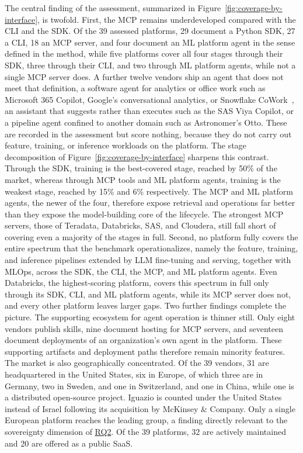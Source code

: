 \documentclass[
english,                 %
bibtex,                  %
]{kththesis}
\numberwithin{listing}{chapter}
\begin{document}
The central finding of the assessment, summarized in Figure~\ref{fig:coverage-by-interface}, is twofold. First, the \gls{MCP} remains underdeveloped compared with the \gls{CLI} and the \gls{SDK}. Of the 39 assessed platforms, 29 document a Python \gls{SDK}, 27 a \gls{CLI}, 18 an \gls{MCP} server, and four document an \gls{ML} platform agent in the sense defined in the method, while five platforms cover all four stages through their \gls{SDK}, three through their \gls{CLI}, and two through \gls{ML} platform agents, while not a single \gls{MCP} server does. A further twelve vendors ship an agent that does not meet that definition, a software agent for analytics or office work such as Microsoft 365 Copilot, Google's conversational analytics, or Snowflake CoWork~\cite{agarwal_snowflake_2026}, an assistant that suggests rather than executes such as the \gls{SAS} Viya Copilot, or a pipeline agent confined to another domain such as Astronomer's Otto. These are recorded in the assessment but score nothing, because they do not carry out feature, training, or inference workloads on the platform. The stage decomposition of Figure~\ref{fig:coverage-by-interface} sharpens this contrast. Through the \gls{SDK}, training is the best-covered stage, reached by 50\% of the market, whereas through \gls{MCP} tools and \gls{ML} platform agents, training is the weakest stage, reached by 15\% and 6\% respectively. The \gls{MCP} and \gls{ML} platform agents, the newer of the four, therefore expose retrieval and operations far better than they expose the model-building core of the lifecycle. The strongest \gls{MCP} servers, those of Teradata, Databricks, \gls{SAS}, and Cloudera, still fall short of covering even a majority of the stages in full. Second, no platform fully covers the entire spectrum that the benchmark operationalizes, namely the feature, training, and inference pipelines extended by \gls{LLM} fine-tuning and serving, together with \gls{MLOps}, across the \gls{SDK}, the \gls{CLI}, the \gls{MCP}, and \gls{ML} platform agents. Even Databricks, the highest-scoring platform, covers this spectrum in full only through its \gls{SDK}, \gls{CLI}, and \gls{ML} platform agents, while its \gls{MCP} server does not, and every other platform leaves larger gaps. Two further findings complete the picture. The supporting ecosystem for agent operation is thinner still. Only eight vendors publish skills, nine document hosting for \gls{MCP} servers, and seventeen document deployments of an organization's own agent in the platform. These supporting artifacts and deployment paths therefore remain minority features. The market is also geographically concentrated. Of the 39 vendors, 31 are headquartered in the United States, six in Europe, of which three are in Germany, two in Sweden, and one in Switzerland, and one in China, while one is a distributed open-source project. Iguazio is counted under the United States instead of Israel following its acquisition by McKinsey \& Company. Only a single European platform reaches the leading group, a finding directly relevant to the sovereignty dimension of \hyperref[rq2]{RQ2}. Of the 39 platforms, 32 are actively maintained and 20 are offered as a public \gls{SaaS}.
\end{document}

